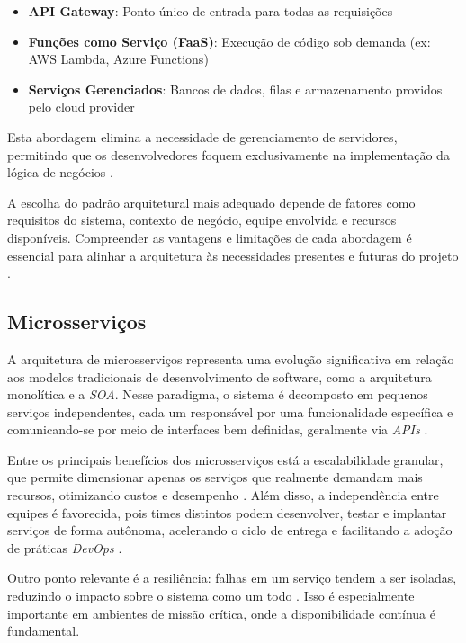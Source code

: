\begin{itemize}
    \item \textbf{API Gateway}: Ponto único de entrada para todas as requisições
    \item \textbf{Funções como Serviço (FaaS)}: Execução de código sob demanda (ex: AWS Lambda, Azure Functions)
    \item \textbf{Serviços Gerenciados}: Bancos de dados, filas e armazenamento providos pelo cloud provider
\end{itemize}

Esta abordagem elimina a necessidade de gerenciamento de servidores, permitindo que os desenvolvedores foquem exclusivamente na implementação da lógica de negócios \cite{shekhar2023microservices}.

A escolha do padrão arquitetural mais adequado depende de fatores como requisitos do sistema, contexto de negócio, equipe envolvida e recursos disponíveis. Compreender as vantagens e limitações de cada abordagem é essencial para alinhar a arquitetura às necessidades presentes e futuras do projeto \cite{jamshidi2016systematic, nizami2020comparison}.

\subsection{Microsserviços}
A arquitetura de microsserviços representa uma evolução significativa em relação aos modelos tradicionais de desenvolvimento de software, como a arquitetura monolítica e a \textit{SOA}. Nesse paradigma, o sistema é decomposto em pequenos serviços independentes, cada um responsável por uma funcionalidade específica e comunicando-se por meio de interfaces bem definidas, geralmente via \textit{APIs} \cite{jamshidi2016systematic, nizami2020comparison}. 

Entre os principais benefícios dos microsserviços está a escalabilidade granular, que permite dimensionar apenas os serviços que realmente demandam mais recursos, otimizando custos e desempenho \cite{shekhar2023microservices}. Além disso, a independência entre equipes é favorecida, pois times distintos podem desenvolver, testar e implantar serviços de forma autônoma, acelerando o ciclo de entrega e facilitando a adoção de práticas \textit{DevOps} \cite{nizami2020comparison, farhan2023performance}.

Outro ponto relevante é a resiliência: falhas em um serviço tendem a ser isoladas, reduzindo o impacto sobre o sistema como um todo \cite{farhan2023performance}. Isso é especialmente importante em ambientes de missão crítica, onde a disponibilidade contínua é fundamental. 

